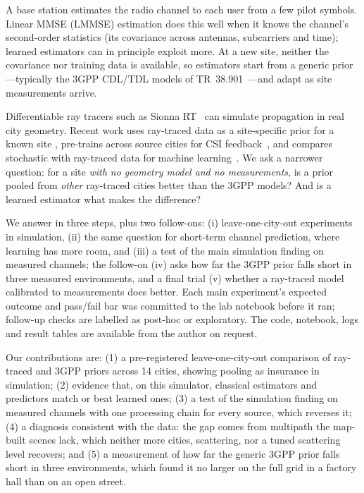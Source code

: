 \documentclass[11pt]{article}
\begin{document}
A base station estimates the radio channel to each user from a few pilot
symbols. Linear MMSE (LMMSE) estimation does this well when it knows the
channel's second-order statistics (its covariance across antennas, subcarriers
and time); learned estimators can in principle exploit more. At a new site,
neither the covariance nor training data is available, so estimators start from
a generic prior---typically the 3GPP CDL/TDL models of TR~38.901~\cite{tr38901}---and
adapt as site measurements arrive.

Differentiable ray tracers such as Sionna RT~\cite{sionnart} can simulate
propagation in real city geometry. Recent work uses ray-traced data as a
site-specific prior for a known site
\cite{delmoro2026,alikhani2025,abouamer2024}, pre-trains across source cities for
CSI feedback~\cite{sifo2026}, and compares stochastic with ray-traced data for
machine learning~\cite{morais2025}. We ask a narrower question: for a site
\emph{with no geometry model and no measurements}, is a prior pooled from
\emph{other} ray-traced cities better than the 3GPP models? And is a learned
estimator what makes the difference?

We answer in three steps, plus two follow-ons: (i) leave-one-city-out experiments in simulation,
(ii) the same question for short-term channel prediction, where learning has
more room, and (iii) a test of the main simulation finding on measured
channels; the follow-on (iv) asks how far the 3GPP prior falls short in three
measured environments, and a final trial (v) whether a ray-traced model
calibrated to measurements does better. Each main experiment's expected outcome and pass/fail bar was
committed to the lab notebook before it ran; follow-up checks are labelled as
post-hoc or exploratory. The code, notebook, logs and result tables are
available from the author on request.

Our contributions are: (1) a pre-registered leave-one-city-out comparison of
ray-traced and 3GPP priors across 14 cities, showing pooling as insurance in
simulation; (2) evidence that, on this simulator, classical estimators and
predictors match or beat learned ones; (3) a test of the simulation finding on
measured channels with one processing chain for every source, which reverses
it; (4) a diagnosis consistent with the data: the gap comes from
multipath the map-built scenes lack, which neither more cities, scattering, nor a tuned scattering level
recovers; and (5) a measurement of how far the generic 3GPP prior falls short
in three environments, which found it no larger on the full grid in a factory hall than on an
open street.
\end{document}
